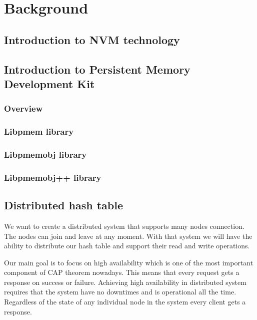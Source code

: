 \chapter{Background}

\section{Introduction to NVM technology}
\section{Introduction to Persistent Memory Development Kit}
\subsection{Overview}
\subsection{Libpmem library}
\subsection{Libpmemobj library}
\subsection{Libpmemobj++ library}

\section{Distributed hash table} %
  We want to create a distributed system that supports many nodes connection.
  The nodes can join and leave at any moment.
  With that system we will have the ability to distribute our hash table and support their read and write operations.

  Our main goal is to focus on high availability which is one of the most important component of CAP theorem nowadays.
  This means that every request gets a response on success or failure. 
  Achieving high availability in distributed system requires that the system have no downtimes and is operational all the time. Regardless of the state of any individual
  node in the system every client gets a response.


